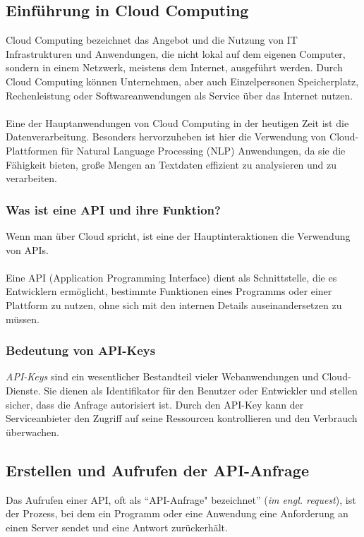 \documentclass[12pt,a4paper]{article}
\begin{document}
\subsection{Einführung in Cloud Computing}
Cloud Computing bezeichnet das Angebot und die Nutzung von IT Infrastrukturen und Anwendungen, die nicht lokal auf dem eigenen Computer, sondern in einem Netzwerk, meistens dem Internet, ausgeführt werden. Durch Cloud Computing können Unternehmen, aber auch Einzelpersonen Speicherplatz, Rechenleistung oder Softwareanwendungen als Service über das Internet nutzen.
\\	\\
Eine der Hauptanwendungen von Cloud Computing in der heutigen Zeit ist die Datenverarbeitung. Besonders hervorzuheben ist hier die Verwendung von Cloud-Plattformen für Natural Language Processing (NLP) Anwendungen, da sie die Fähigkeit bieten, große Mengen an Textdaten effizient zu analysieren und zu verarbeiten. 
\subsubsection{Was ist eine API und ihre Funktion?}
Wenn man über Cloud spricht, ist eine der Hauptinteraktionen die Verwendung von APIs. 
\\ \\
Eine API (Application Programming Interface) dient als Schnittstelle, die es Entwicklern ermöglicht, bestimmte Funktionen eines Programms oder einer Plattform zu nutzen, ohne sich mit den internen Details auseinandersetzen zu müssen. 

\subsubsection{Bedeutung von API-Keys}
\textit{API-Keys} sind ein wesentlicher Bestandteil vieler Webanwendungen und Cloud-Dienste. Sie dienen als Identifikator für den Benutzer oder Entwickler und stellen sicher, dass die Anfrage autorisiert ist. Durch den API-Key kann der Serviceanbieter den Zugriff auf seine Ressourcen kontrollieren und den Verbrauch überwachen.

\newpage
\subsection{Erstellen und Aufrufen der API-Anfrage}
Das Aufrufen einer API, oft als \enquote{API-Anfrage" bezeichnet} (\textit{im engl. request}), ist der Prozess, bei dem ein Programm oder eine Anwendung eine Anforderung an einen Server sendet und eine Antwort zurückerhält.
\end{document}
